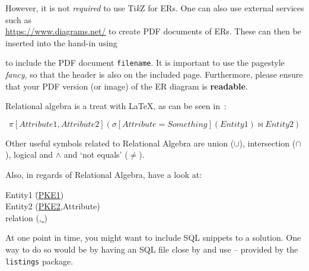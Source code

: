 \documentclass{article}
\newcommand*{\TikZ}{Ti\textit{k}Z}
\begin{document}
However, it is not \emph{required} to use \TikZ{} for ERs. One can also use external services such as \\
\url{https://www.diagrams.net/} to create PDF documents of ERs.
These can then be inserted into the hand-in using

 \verb||

 to include the PDF document \verb|filename|.
It is important to use the pagestyle \emph{fancy}, so that the header is also on the included page. Furthermore, please ensure that your PDF version (or image) of the ER diagram is \textbf{readable}.

\task{}
Relational algebra is a treat with \LaTeX, as can be seen in~:

\begin{equation}
\label{eq:ans}
\pi\left[Attribute1,Attribute2\right](\sigma\left[Attribute=Something\right](Entity1) \Join Entity2)
\end{equation}

Other useful symbols related to Relational Algebra are union ($\cup$), intersection ($\cap$), logical and $\land$ and `not equals' ($\not=$).

Also, in regards of Relational Algebra, have a look at:\\
\begin{center}
\begin{tabbing}
    Entity1 \qquad\qquad\= (\uline{PKE1})\\
    Entity2 \> (\uline{PKE2},Attribute)\\
    relation \> (\uline{, })
\end{tabbing}    
\end{center}

\task{}
At one point in time, you might want to include SQL snippets to a solution.
One way to do so would be by having an SQL file close by and use \verb|| -- provided by the \verb|listings| package.



\task{}
\end{document}

